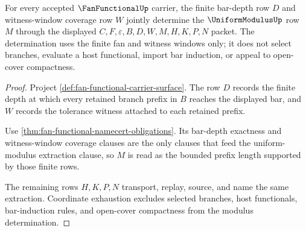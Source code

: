 \begin{theorem}
\label{thm:fan-functional-finite-bar-modulus-obligations}
For every accepted $\FanFunctionalUp$ carrier, the finite bar-depth row $D$ and witness-window coverage row $W$ jointly determine the $\UniformModulusUp$ row $M$ through the displayed $C,F,\varepsilon,B,D,W,M,H,K,P,N$ packet. The determination uses the finite fan and witness windows only; it does not select branches, evaluate a host functional, import bar induction, or appeal to open-cover compactness.
\end{theorem}
\begin{proof}
Project \autoref{def:fan-functional-carrier-surface}. The row $D$ records the finite depth at which every retained branch prefix in $B$ reaches the displayed bar, and $W$ records the tolerance witness attached to each retained prefix.

Use \autoref{thm:fan-functional-namecert-obligations}. Its bar-depth exactness and witness-window coverage clauses are the only clauses that feed the uniform-modulus extraction clause, so $M$ is read as the bounded prefix length supported by those finite rows.

The remaining rows $H,K,P,N$ transport, replay, source, and name the same extraction. Coordinate exhaustion excludes selected branches, host functionals, bar-induction rules, and open-cover compactness from the modulus determination.
\end{proof}

